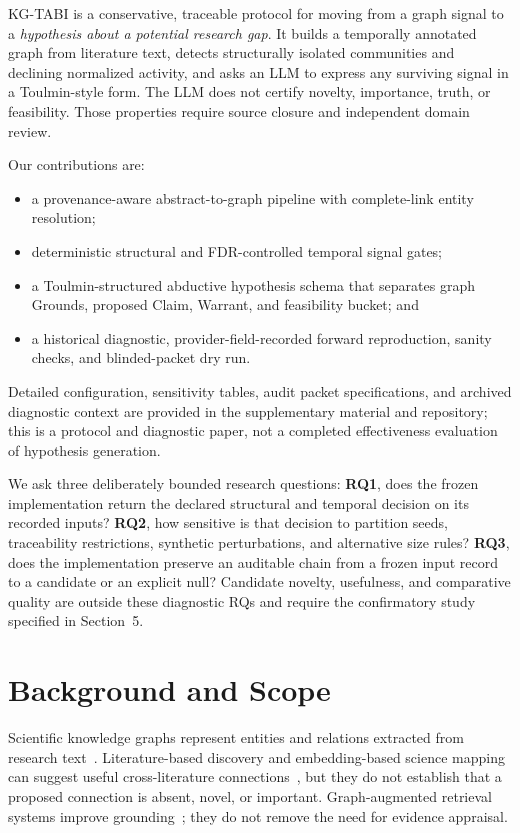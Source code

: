\documentclass[runningheads]{llncs}
\begin{document}
KG-TABI is a conservative, traceable protocol for moving from a graph signal to a \emph{hypothesis about a potential research gap}. It builds a temporally annotated graph from literature text, detects structurally isolated communities and declining normalized activity, and asks an LLM to express any surviving signal in a Toulmin-style form. The LLM does not certify novelty, importance, truth, or feasibility. Those properties require source closure and independent domain review.

Our contributions are:
\begin{itemize}
\item a provenance-aware abstract-to-graph pipeline with complete-link entity resolution;
\item deterministic structural and FDR-controlled temporal signal gates;
\item a Toulmin-structured abductive hypothesis schema that separates graph Grounds, proposed Claim, Warrant, and feasibility bucket; and
\item a historical diagnostic, provider-field-recorded forward reproduction, sanity checks, and blinded-packet dry run.
\end{itemize}
Detailed configuration, sensitivity tables, audit packet specifications, and archived diagnostic context are provided in the supplementary material and repository; this is a protocol and diagnostic paper, not a completed effectiveness evaluation of hypothesis generation.

We ask three deliberately bounded research questions: \textbf{RQ1}, does the frozen implementation return the declared structural and temporal decision on its recorded inputs? \textbf{RQ2}, how sensitive is that decision to partition seeds, traceability restrictions, synthetic perturbations, and alternative size rules? \textbf{RQ3}, does the implementation preserve an auditable chain from a frozen input record to a candidate or an explicit null? Candidate novelty, usefulness, and comparative quality are outside these diagnostic RQs and require the confirmatory study specified in Section~5.

\section{Background and Scope}
Scientific knowledge graphs represent entities and relations extracted from research text~\cite{jaradeh2019open,luan2018information}. Literature-based discovery and embedding-based science mapping can suggest useful cross-literature connections~\cite{swanson1986fish,tshitoyan2019embeddings}, but they do not establish that a proposed connection is absent, novel, or important. Graph-augmented retrieval systems improve grounding~\cite{edge2024graphrag,guo2024lightrag,gutierrez2024hipporag}; they do not remove the need for evidence appraisal.
\end{document}
